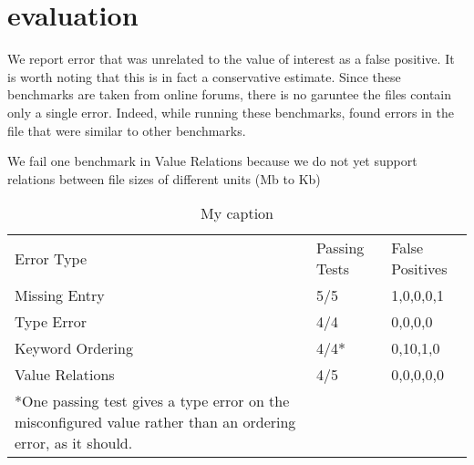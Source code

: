 \section{evaluation}

We report error that was unrelated to the value of interest as a false positive.
It is worth noting that this is in fact a conservative estimate.
Since these benchmarks are taken from online forums, there is no garuntee the files contain only a single error.
Indeed, while running these benchmarks, \app found errors in the file that were similar to other benchmarks. 

We fail one benchmark in Value Relations because we do not yet support relations between file sizes of different units (Mb to Kb)

\begin{table}[]
\centering
\caption{My caption}
\label{my-label}
\begin{tabular}{lll}
Error Type       & Passing Tests & False Positives  \\
Missing Entry    & 5/5           & 1,0,0,0,1        \\
Type Error       & 4/4           & 0,0,0,0          \\
Keyword Ordering & 4/4*          & 0,10,1,0         \\
Value Relations  & 4/5           & 0,0,0,0,0        \\
*One passing test gives a type error on the misconfigured value rather than an ordering error, as it should.
\end{tabular}
\end{table}
